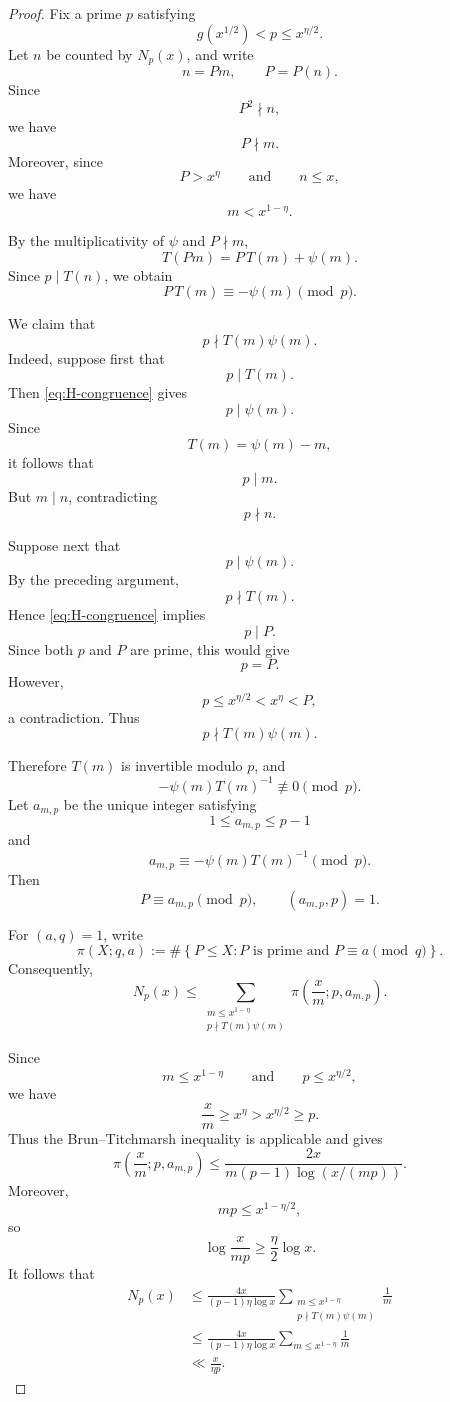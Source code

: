\documentclass{article}
\begin{document}
\begin{proof}
Fix a prime $p$ satisfying
\[
g(x^{1/2})<p\le x^{\eta/2}.
\]
Let $n$ be counted by $N_p(x)$, and write
\[
n=Pm,
\qquad
P=P(n).
\]
Since
\[
P^2\nmid n,
\]
we have
\[
P\nmid m.
\]
Moreover, since
\[
P>x^\eta
\qquad\text{and}\qquad
n\le x,
\]
we have
\[
m<x^{1-\eta}.
\]

By the multiplicativity of $\psi$ and $P\nmid m$,
\begin{equation}
T(Pm)
=
P\,T(m)+\psi(m).
\label{eq:H-linear-identity}
\end{equation}
Since $p\mid T(n)$, we obtain
\begin{equation}
P\,T(m)
\equiv
-\psi(m)
\pmod p.
\label{eq:H-congruence}
\end{equation}

We claim that
\[
p\nmid T(m)\psi(m).
\]
Indeed, suppose first that
\[
p\mid T(m).
\]
Then \eqref{eq:H-congruence} gives
\[
p\mid\psi(m).
\]
Since
\[
T(m)=\psi(m)-m,
\]
it follows that
\[
p\mid m.
\]
But $m\mid n$, contradicting
\[
p\nmid n.
\]

Suppose next that
\[
p\mid\psi(m).
\]
By the preceding argument,
\[
p\nmid T(m).
\]
Hence \eqref{eq:H-congruence} implies
\[
p\mid P.
\]
Since both $p$ and $P$ are prime, this would give
\[
p=P.
\]
However,
\[
p
\le
x^{\eta/2}
<
x^\eta
<
P,
\]
a contradiction. Thus
\[
p\nmid T(m)\psi(m).
\]

Therefore $T(m)$ is invertible modulo $p$, and
\[
-\psi(m)T(m)^{-1}
\not\equiv
0
\pmod p.
\]
Let $a_{m,p}$ be the unique integer satisfying
\[
1\le a_{m,p}\le p-1
\]
and
\[
a_{m,p}
\equiv
-\psi(m)T(m)^{-1}
\pmod p.
\]
Then
\[
P\equiv a_{m,p}\pmod p,
\qquad
(a_{m,p},p)=1.
\]

For $(a,q)=1$, write
\[
\pi(X;q,a)
:=
\#\left\{
P\le X:
P\text{ is prime and }P\equiv a\pmod q
\right\}.
\]
Consequently,
\[
N_p(x)
\le
\sum_{\substack{
m\le x^{1-\eta}\\
p\nmid T(m)\psi(m)}}
\pi\left(
\frac{x}{m};
p,a_{m,p}
\right).
\]

Since
\[
m\le x^{1-\eta}
\qquad\text{and}\qquad
p\le x^{\eta/2},
\]
we have
\[
\frac{x}{m}
\ge
x^\eta
>
x^{\eta/2}
\ge
p.
\]
Thus the Brun--Titchmarsh inequality \cite{ref14} is applicable and
gives
\[
\pi\left(
\frac{x}{m};
p,a_{m,p}
\right)
\le
\frac{2x}
{m(p-1)\log(x/(mp))}.
\]
Moreover,
\[
mp
\le
x^{1-\eta/2},
\]
so
\[
\log\frac{x}{mp}
\ge
\frac{\eta}{2}\log x.
\]
It follows that
\[
\begin{aligned}
N_p(x)
&\le
\frac{4x}
{(p-1)\eta\log x}
\sum_{\substack{
m\le x^{1-\eta}\\
p\nmid T(m)\psi(m)}}
\frac1m\\
&\le
\frac{4x}
{(p-1)\eta\log x}
\sum_{m\le x^{1-\eta}}\frac1m\\
&\ll
\frac{x}{\eta p}.
\end{aligned}
\]


\end{proof}
\end{document}

